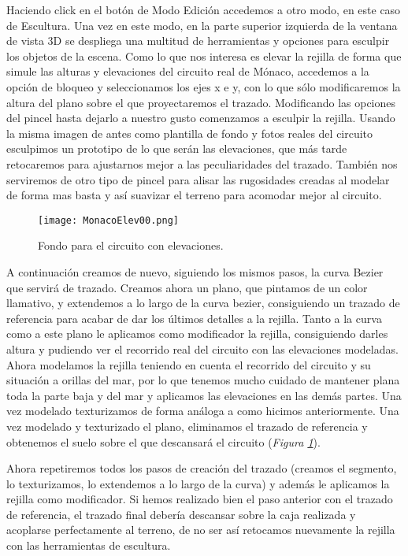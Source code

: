 Haciendo click en el botón de Modo Edición accedemos a otro modo, en este caso de Escultura. Una vez en este modo, en la parte superior izquierda de la ventana de vista 3D se despliega una multitud de herramientas y opciones para esculpir los objetos de la escena. Como lo que nos interesa es elevar la rejilla de forma que simule las alturas y elevaciones del circuito real de Mónaco, accedemos a la opción de bloqueo y seleccionamos los ejes x e y, con lo que sólo modificaremos la altura del plano sobre el que proyectaremos el trazado. Modificando las opciones del pincel hasta dejarlo a nuestro gusto comenzamos a esculpir la rejilla. Usando la misma imagen de antes como plantilla de fondo y fotos reales del circuito esculpimos un prototipo de lo que serán las elevaciones, que más tarde retocaremos para ajustarnos mejor a las peculiaridades del trazado. También nos serviremos de otro tipo de pincel para alisar las rugosidades creadas al modelar de forma mas basta y así suavizar el terreno para acomodar mejor al circuito.

\begin{figure}[t]
	\centering
	\texttt{[image: MonacoElev00.png]}
	\caption{Fondo para el circuito con elevaciones.} \label{fig:monacoelev00}
\end{figure}

A continuación creamos de nuevo, siguiendo los mismos pasos, la curva Bezier que servirá de trazado. Creamos ahora un plano, que pintamos de un color llamativo, y extendemos a lo largo de la curva bezier, consiguiendo un trazado de referencia para acabar de dar los últimos detalles a la rejilla. Tanto a la curva como a este plano le aplicamos como modificador la rejilla, consiguiendo darles altura y pudiendo ver el recorrido real del circuito con las elevaciones modeladas. Ahora modelamos la rejilla teniendo en cuenta el recorrido del circuito y su situación a orillas del mar, por lo que tenemos mucho cuidado de mantener plana toda la parte baja y del mar y aplicamos las elevaciones en las demás partes. Una vez modelado texturizamos de forma análoga a como hicimos anteriormente. Una vez modelado y texturizado el plano, eliminamos el trazado de referencia y obtenemos el suelo sobre el que descansará el circuito (\textit{Figura \ref{fig:monacoelev00}}).

Ahora repetiremos todos los pasos de creación del trazado (creamos el segmento, lo texturizamos, lo extendemos a lo largo de la curva) y además le aplicamos la rejilla como modificador. Si hemos realizado bien el paso anterior con el trazado de referencia, el trazado final debería descansar sobre la caja realizada y acoplarse perfectamente al terreno, de no ser así retocamos nuevamente la rejilla con las herramientas de escultura. 

